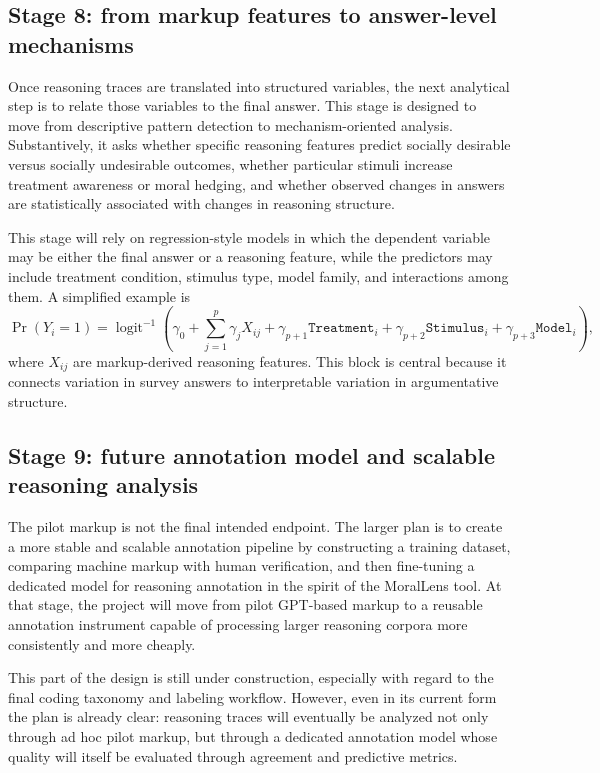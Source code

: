 \documentclass[14pt,a4paper]{extarticle}
\begin{document}
\subsection{Stage 8: from markup features to answer-level mechanisms}

Once reasoning traces are translated into structured variables, the next analytical step is to relate those variables to the final answer. This stage is designed to move from descriptive pattern detection to mechanism-oriented analysis. Substantively, it asks whether specific reasoning features predict socially desirable versus socially undesirable outcomes, whether particular stimuli increase treatment awareness or moral hedging, and whether observed changes in answers are statistically associated with changes in reasoning structure.

This stage will rely on regression-style models in which the dependent variable may be either the final answer or a reasoning feature, while the predictors may include treatment condition, stimulus type, model family, and interactions among them. A simplified example is
\[
\Pr(Y_i = 1) = \operatorname{logit}^{-1}\!\left(\gamma_0 + \sum_{j=1}^{p}\gamma_j X_{ij} + \gamma_{p+1}\texttt{Treatment}_i + \gamma_{p+2}\texttt{Stimulus}_i + \gamma_{p+3}\texttt{Model}_i \right),
\]
where \(X_{ij}\) are markup-derived reasoning features. This block is central because it connects variation in survey answers to interpretable variation in argumentative structure.

\subsection{Stage 9: future annotation model and scalable reasoning analysis}

The pilot markup is not the final intended endpoint. The larger plan is to create a more stable and scalable annotation pipeline by constructing a training dataset, comparing machine markup with human verification, and then fine-tuning a dedicated model for reasoning annotation in the spirit of the MoralLens tool. At that stage, the project will move from pilot GPT-based markup to a reusable annotation instrument capable of processing larger reasoning corpora more consistently and more cheaply.

This part of the design is still under construction, especially with regard to the final coding taxonomy and labeling workflow. However, even in its current form the plan is already clear: reasoning traces will eventually be analyzed not only through ad hoc pilot markup, but through a dedicated annotation model whose quality will itself be evaluated through agreement and predictive metrics.
\end{document}

